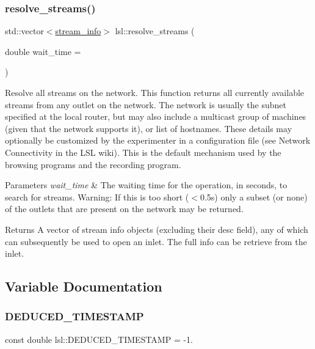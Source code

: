 \subsubsection{\texorpdfstring{resolve\+\_\+streams()}{resolve\_streams()}}
{\footnotesize\ttfamily std\+::vector$<$\hyperlink{classlsl_1_1stream__info}{stream\+\_\+info}$>$ lsl\+::resolve\+\_\+streams (\begin{DoxyParamCaption}\item[{double}]{wait\+\_\+time = {} }\end{DoxyParamCaption})\hspace{0.3cm}{\ttfamily [inline]}}

Resolve all streams on the network. This function returns all currently available streams from any outlet on the network. The network is usually the subnet specified at the local router, but may also include a multicast group of machines (given that the network supports it), or list of hostnames. These details may optionally be customized by the experimenter in a configuration file (see Network Connectivity in the L\+SL wiki). This is the default mechanism used by the browsing programs and the recording program. 
\begin{DoxyParams}{Parameters}
{\em wait\+\_\+time} & The waiting time for the operation, in seconds, to search for streams. Warning\+: If this is too short ($<$0.\+5s) only a subset (or none) of the outlets that are present on the network may be returned. \\
\hline
\end{DoxyParams}
\begin{DoxyReturn}{Returns}
A vector of stream info objects (excluding their desc field), any of which can subsequently be used to open an inlet. The full info can be retrieve from the inlet. 
\end{DoxyReturn}


\subsection{Variable Documentation}
\mbox{\label{namespacelsl_a57df17d8a2563a18b8b759a0cec696cc}} 
\subsubsection{\texorpdfstring{D\+E\+D\+U\+C\+E\+D\+\_\+\+T\+I\+M\+E\+S\+T\+A\+MP}{DEDUCED\_TIMESTAMP}}
{\footnotesize\ttfamily const double lsl\+::\+D\+E\+D\+U\+C\+E\+D\+\_\+\+T\+I\+M\+E\+S\+T\+A\+MP = -\/1.}

